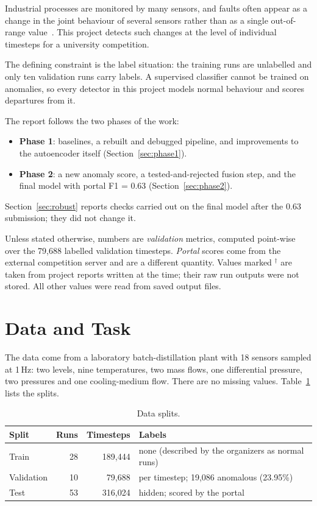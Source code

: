 \documentclass[runningheads]{llncs}
\newcommand{\doc}{$^\dagger$}
\begin{document}
Industrial processes are monitored by many sensors, and faults often appear as a change in the joint behaviour of several sensors rather than as a single out-of-range value~\cite{malhotra2016lstm,hundman2018detecting,audibert2020usad}. This project detects such changes at the level of individual timesteps for a university competition.

The defining constraint is the label situation: the training runs are unlabelled and only ten validation runs carry labels. A supervised classifier cannot be trained on anomalies, so every detector in this project models normal behaviour and scores departures from it.

The report follows the two phases of the work:
\begin{itemize}
  \item \textbf{Phase 1}: baselines, a rebuilt and debugged pipeline, and improvements to the autoencoder itself (Section~\ref{sec:phase1}).
  \item \textbf{Phase 2}: a new anomaly score, a tested-and-rejected fusion step, and the final model with portal F1 = 0.63 (Section~\ref{sec:phase2}).
\end{itemize}
Section~\ref{sec:robust} reports checks carried out on the final model after the 0.63 submission; they did not change it.

Unless stated otherwise, numbers are \emph{validation} metrics, computed point-wise over the 79{,}688 labelled validation timesteps. \emph{Portal} scores come from the external competition server and are a different quantity. Values marked \doc{} are taken from project reports written at the time; their raw run outputs were not stored. All other values were read from saved output files.

\section{Data and Task}

The data come from a laboratory batch-distillation plant with 18 sensors sampled at 1\,Hz: two levels, nine temperatures, two mass flows, one differential pressure, two pressures and one cooling-medium flow. There are no missing values. Table~\ref{tab:data} lists the splits.

\begin{table}[ht]
\centering
\caption{Data splits.}\label{tab:data}
\begin{tabular}{|l|r|r|l|}
\hline
Split & Runs & Timesteps & Labels \\
\hline
Train & 28 & 189{,}444 & none (described by the organizers as normal runs) \\
Validation & 10 & 79{,}688 & per timestep; 19{,}086 anomalous (23.95\%) \\
Test & 53 & 316{,}024 & hidden; scored by the portal \\
\hline
\end{tabular}
\end{table}
\end{document}
